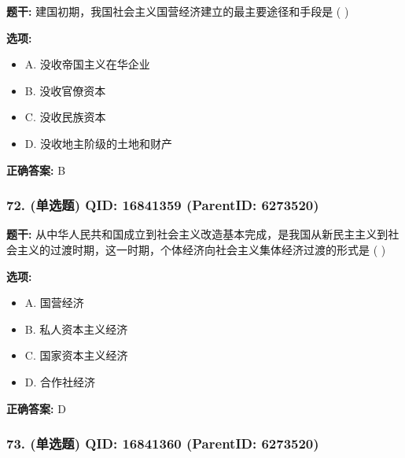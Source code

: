 \documentclass[12pt,UTF8]{ctexart}
\begin{document}
\textbf{题干:}
建国初期，我国社会主义国营经济建立的最主要途径和手段是 ( )



\textbf{选项:}
\begin{itemize}[leftmargin=*]

  \item A. 没收帝国主义在华企业

  \item B. 没收官僚资本

  \item C. 没收民族资本

  \item D. 没收地主阶级的土地和财产

\end{itemize}

\textbf{正确答案:}
B

\vspace{0.3em}\hrulefill\vspace{0.7em}

\subsubsection*{72. (单选题) \small QID: 16841359 (ParentID: 6273520)}

\textbf{题干:}
从中华人民共和国成立到社会主义改造基本完成，是我国从新民主主义到社会主义的过渡时期，这一时期，个体经济向社会主义集体经济过渡的形式是 ( )



\textbf{选项:}
\begin{itemize}[leftmargin=*]

  \item A. 国营经济

  \item B. 私人资本主义经济

  \item C. 国家资本主义经济

  \item D. 合作社经济

\end{itemize}

\textbf{正确答案:}
D

\vspace{0.3em}\hrulefill\vspace{0.7em}

\subsubsection*{73. (单选题) \small QID: 16841360 (ParentID: 6273520)}
\end{document}
